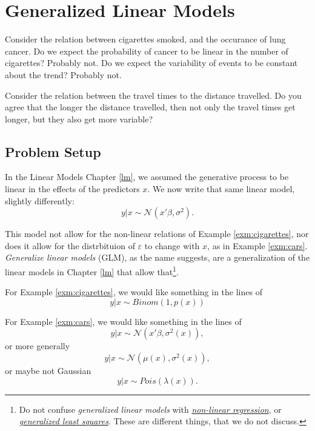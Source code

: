 \documentclass[]{book}
\theoremstyle{definition}
\theoremstyle{definition}
\theoremstyle{definition}
\theoremstyle{remark}
\let\BeginKnitrBlock\begin \let\EndKnitrBlock\end
\begin{document}
\chapter{Generalized Linear Models}\label{glm}

\BeginKnitrBlock{example}
\protect\hypertarget{exm:cigarettes}{}{\label{exm:cigarettes} }Consider the
relation between cigarettes smoked, and the occurance of lung cancer. Do
we expect the probability of cancer to be linear in the number of
cigarettes? Probably not. Do we expect the variability of events to be
constant about the trend? Probably not.
\EndKnitrBlock{example}

\BeginKnitrBlock{example}
\protect\hypertarget{exm:cars}{}{\label{exm:cars} }Consider the relation
between the travel times to the distance travelled. Do you agree that
the longer the distance travelled, then not only the travel times get
longer, but they also get more variable?
\EndKnitrBlock{example}

\section{Problem Setup}\label{problem-setup-1}

In the Linear Models Chapter \ref{lm}, we assumed the generative process
to be linear in the effects of the predictors \(x\). We now write that
same linear model, slightly differently: \[
 y|x \sim \mathcal{N}(x'\beta, \sigma^2).
\]

This model not allow for the non-linear relations of Example
\ref{exm:cigarettes}, nor does it allow for the distrbituion of
\(\varepsilon\) to change with \(x\), as in Example \ref{exm:cars}.
\emph{Generalize linear models} (GLM), as the name suggests, are a
generalization of the linear models in Chapter \ref{lm} that allow
that\footnote{Do not confuse \emph{generalized linear models} with
  \href{https://en.wikipedia.org/wiki/Nonlinear_regression}{\emph{non-linear
  regression}}, or
  \href{https://en.wikipedia.org/wiki/Generalized_least_squares}{\emph{generalized
  least squares}}. These are different things, that we do not discuss.}.

For Example \ref{exm:cigarettes}, we would like something in the lines
of \[
 y|x \sim Binom(1,p(x))
\]

For Example \ref{exm:cars}, we would like something in the lines of \[
 y|x \sim \mathcal{N}(x'\beta,\sigma^2(x)),
\] or more generally \[
 y|x \sim \mathcal{N}(\mu(x),\sigma^2(x)),
\] or maybe not Gaussian \[
 y|x \sim Pois(\lambda(x)).
\]
\end{document}
